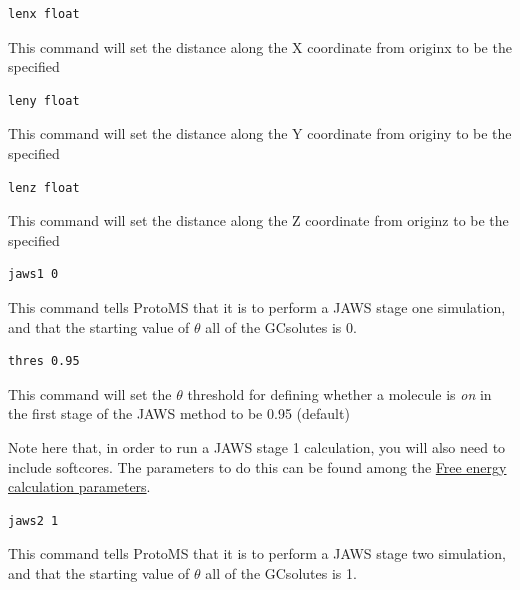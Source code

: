 \documentclass[letterpaper,10pt,english]{sphinxmanual}
\begin{document}
\begin{Verbatim}[commandchars=\\\{\}]
lenx float
\end{Verbatim}

This command will set the distance along the X coordinate from originx to be the specified 

\begin{Verbatim}[commandchars=\\\{\}]
leny float
\end{Verbatim}

This command will set the distance along the Y coordinate from originy to be the specified 

\begin{Verbatim}[commandchars=\\\{\}]
lenz float
\end{Verbatim}

This command will set the distance along the Z coordinate from originz to be the specified 

\begin{Verbatim}[commandchars=\\\{\}]
jaws1 0
\end{Verbatim}

This command tells ProtoMS that it is to perform a JAWS stage one simulation, and that the starting value of \(\theta\) all of the GCsolutes is 0.

\begin{Verbatim}[commandchars=\\\{\}]
thres 0.95
\end{Verbatim}

This command will set the \(\theta\) threshold for defining whether a molecule is \emph{on} in the first stage of the JAWS method to be 0.95 (default)

Note here that, in order to run a JAWS stage 1 calculation, you will also need to include softcores. The parameters to do this can be found among the {\hyperref[protoms:free-energy-calculation-parameters]{Free energy calculation parameters}}.

\begin{Verbatim}[commandchars=\\\{\}]
jaws2 1
\end{Verbatim}

This command tells ProtoMS that it is to perform a JAWS stage two simulation, and that the starting value of \(\theta\) all of the GCsolutes is 1.
\end{document}
